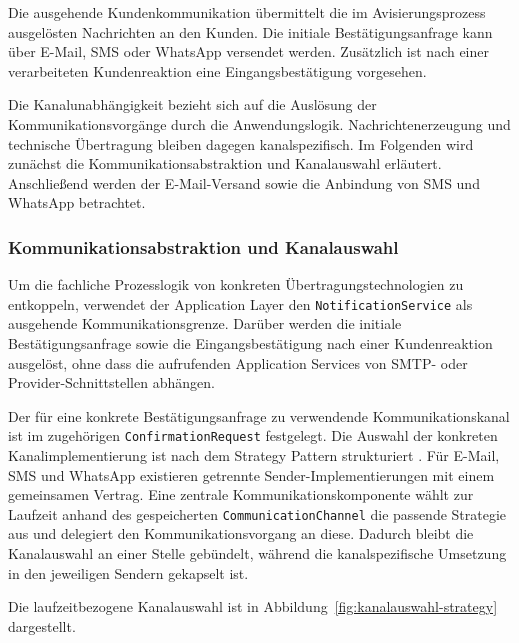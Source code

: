 Die ausgehende Kundenkommunikation übermittelt die im Avisierungsprozess
ausgelösten Nachrichten an den Kunden. Die initiale
Bestätigungsanfrage kann über E-Mail, SMS oder WhatsApp versendet werden.
Zusätzlich ist nach einer verarbeiteten Kundenreaktion eine Eingangsbestätigung
vorgesehen.

Die Kanalunabhängigkeit bezieht sich auf die Auslösung der
Kommunikationsvorgänge durch die Anwendungslogik. Nachrichtenerzeugung und
technische Übertragung bleiben dagegen kanalspezifisch. Im Folgenden wird
zunächst die Kommunikationsabstraktion und Kanalauswahl erläutert. Anschließend
werden der E-Mail-Versand sowie die Anbindung von SMS und WhatsApp betrachtet.

\subsubsection{Kommunikationsabstraktion und Kanalauswahl}
\label{sec:kommunikationsabstraktion}

Um die fachliche Prozesslogik von konkreten Übertragungstechnologien zu
entkoppeln, verwendet der Application Layer den \texttt{NotificationService}
als ausgehende Kommunikationsgrenze. Darüber werden die initiale
Bestätigungsanfrage sowie die Eingangsbestätigung nach einer
Kundenreaktion ausgelöst, ohne dass die aufrufenden Application Services von
SMTP- oder Provider-Schnittstellen abhängen.

Der für eine konkrete Bestätigungsanfrage zu verwendende
Kommunikationskanal ist im zugehörigen \texttt{ConfirmationRequest} festgelegt.
Die Auswahl der konkreten Kanalimplementierung ist nach dem Strategy Pattern
strukturiert \parencite{gamma1994designPatterns}. Für E-Mail, SMS und WhatsApp existieren
getrennte Sender-Implementierungen mit einem gemeinsamen Vertrag. Eine zentrale
Kommunikationskomponente wählt zur Laufzeit anhand des gespeicherten
\texttt{CommunicationChannel} die passende Strategie aus und delegiert den
Kommunikationsvorgang an diese. Dadurch bleibt die Kanalauswahl an einer Stelle
gebündelt, während die kanalspezifische Umsetzung in den jeweiligen Sendern
gekapselt ist.

Die laufzeitbezogene Kanalauswahl ist in
Abbildung~\ref{fig:kanalauswahl-strategy} dargestellt.

